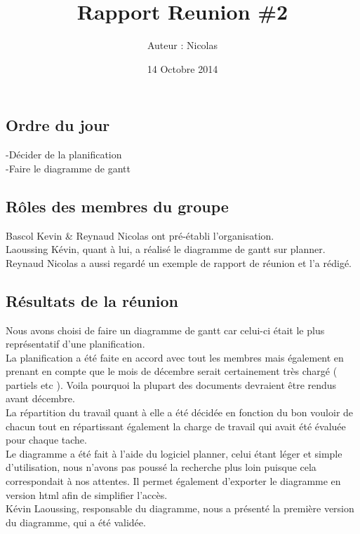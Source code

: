 \documentclass{article}
\title{Rapport Reunion \#2}
\author{Auteur : Nicolas \bsc{Reynaud}}
\date{14 Octobre 2014}
\begin{document}
\maketitle
\newpage



\subsection*{Ordre du jour}
\indent -Décider de la planification\\
-Faire le diagramme de gantt\\

\subsection*{Rôles des membres du groupe}
Bascol Kevin \& Reynaud Nicolas ont pré-établi l'organisation.\\
\indent Laoussing Kévin, quant à lui, a réalisé le diagramme de gantt sur planner.\\
\indent Reynaud Nicolas a aussi regardé un exemple de rapport de réunion et l'a rédigé.\\

\subsection*{Résultats de la réunion}
Nous avons choisi de faire un diagramme de gantt car celui-ci était le plus représentatif d'une planification.\\

La planification a été faite en accord avec tout les membres mais également en prenant en compte que le mois de décembre serait certainement très chargé ( partiels etc ). Voila pourquoi la plupart des documents devraient être rendus avant décembre.\\

La répartition du travail quant à elle a été décidée en fonction du bon vouloir de chacun tout en répartissant également la charge de travail qui avait été évaluée pour chaque tache.\\

Le diagramme a été fait à l'aide du logiciel planner, celui étant léger et simple d'utilisation, nous n'avons pas poussé la recherche plus loin puisque cela correspondait à nos attentes.
Il permet également d'exporter le diagramme en version html afin de simplifier l'accès.\\
Kévin Laoussing, responsable du diagramme, nous a présenté la première version du diagramme, qui a été validée.\\
\end{document}
